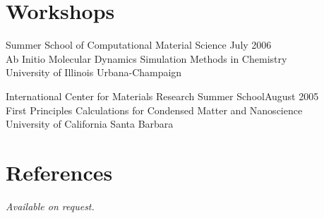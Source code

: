 \documentclass[margin,line]{resume}
\begin{document}
\begin{resume}
                \section{\mysidestyle Workshops}
		Summer School of Computational Material Science \hfill July 2006\\
		Ab Initio Molecular Dynamics Simulation Methods in Chemistry\\
		University of Illinois Urbana-Champaign\vspace{-2mm}\\\vspace{-2mm}

		International Center for Materials Research Summer School\hfill August 2005\\
		First Principles Calculations for Condensed Matter and Nanoscience\\
		University of California Santa Barbara\\



		\section{\mysidestyle References}
		{\sl Available on request.}
\end{resume}
\end{document}
